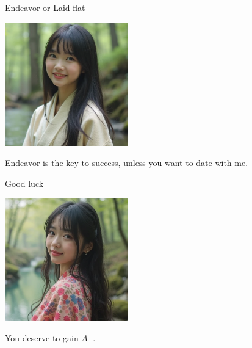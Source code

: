 \documentclass{beamer}
\begin{document}
\begin{frame}{Endeavor or Laid flat}
\begin{center}
\includegraphics[width=0.4\textwidth]{fail.png}
\end{center}
\begin{center}
Endeavor is the key to success, unless you want to date with me.
\end{center}
\end{frame}
\begin{frame}{Good luck}
\begin{center}
\includegraphics[width=0.4\textwidth]{good_luck.png}
\end{center}
\begin{center}
You deserve to gain $A^+$.
\end{center}
\end{frame}
\end{document}
